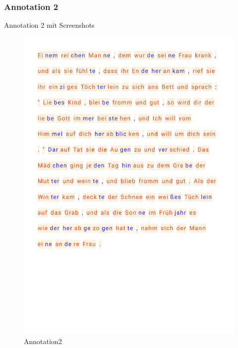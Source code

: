 \subsubsection{Annotation 2}
Annotation 2 mit Screenshots
\begin{figure}[h!]
	\centering
	\includegraphics[width=.7\linewidth, frame]{figures/evaluation/annotation2}
	\caption{Annotation2}
	\label{fig:frontend-home}
\end{figure}
\newpage

